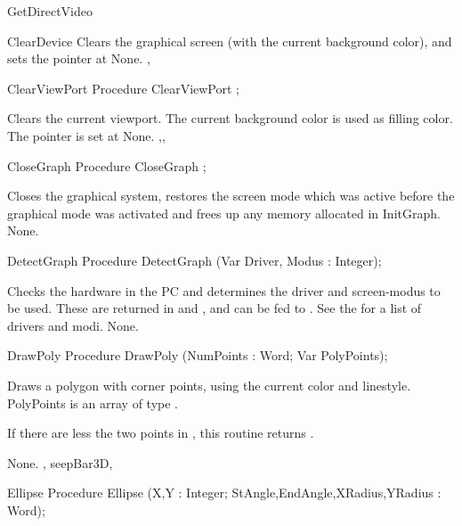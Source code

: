 \begin{function}{GetDirectVideo}
\begin{procedure}{ClearDevice}
\Description
Clears the graphical screen (with the current
background color), and sets the pointer at 
\Errors
None.
\SeeAlso
{}, 
\end{procedure}

\begin{procedure}{ClearViewPort}
\Declaration
Procedure ClearViewPort ;

\Description
Clears the current viewport. The current background color is used as filling
color. The pointer is set at 
\Errors
None.
\SeeAlso
{},, 
\end{procedure}

\begin{procedure}{CloseGraph}
\Declaration
Procedure CloseGraph ;

\Description
Closes the graphical system, restores the
screen mode which was active before the graphical mode was
activated and frees up any memory allocated in InitGraph.
\Errors
None.
\SeeAlso
{}
\end{procedure}

\begin{procedure}{DetectGraph}
\Declaration
Procedure DetectGraph (Var Driver, Modus : Integer);

\Description
 Checks the hardware in the PC and determines the driver and screen-modus to
be used. These are returned in  and , and can be fed
to .
See the  for a list of drivers and modi.
\Errors
None.
\SeeAlso
{}
\end{procedure}


\begin{procedure}{DrawPoly}
\Declaration
Procedure DrawPoly (NumPoints : Word; Var PolyPoints);

\Description

Draws a polygon with  corner points, using the
current color and linestyle. PolyPoints is an array of type .

If there are less the two points in , this routine
returns .

\Errors
None.
\SeeAlso
{}, seep{Bar3D}, 
\end{procedure}

\begin{procedure}{Ellipse}
\Declaration
Procedure Ellipse (X,Y : Integer; StAngle,EndAngle,XRadius,YRadius : Word);


\end{procedure}
\end{function}
